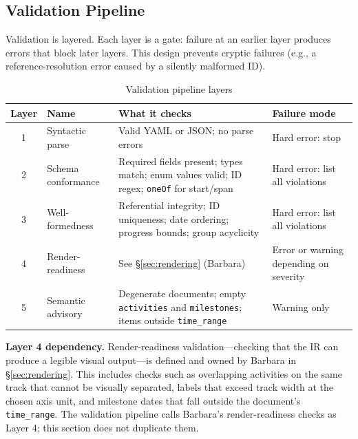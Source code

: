 \subsection{Validation Pipeline}
\label{sec:validation-pipeline}

Validation is layered. Each layer is a gate: failure at an earlier layer produces
errors that block later layers. This design prevents cryptic failures (e.g., a
reference-resolution error caused by a silently malformed ID).

\begin{table}[h]
\centering
\small
\begin{tabular}{clp{4cm}p{4.5cm}}
\toprule
\textbf{Layer} & \textbf{Name} & \textbf{What it checks} & \textbf{Failure mode} \\
\midrule
1 & Syntactic parse       & Valid YAML or JSON; no parse errors & Hard error: stop \\
2 & Schema conformance    & Required fields present; types match; enum values valid; ID regex; \texttt{oneOf} for start/span & Hard error: list all violations \\
3 & Well-formedness       & Referential integrity; ID uniqueness; date ordering; progress bounds; group acyclicity & Hard error: list all violations \\
4 & Render-readiness      & See \S\ref{sec:rendering} (Barbara) & Error or warning depending on severity \\
5 & Semantic advisory     & Degenerate documents; empty \texttt{activities} and \texttt{milestones}; items outside \texttt{time\_range} & Warning only \\
\bottomrule
\end{tabular}
\caption{Validation pipeline layers}
\label{tab:validation-layers}
\end{table}

\textbf{Layer 4 dependency.} Render-readiness validation---checking that the IR can
produce a legible visual output---is defined and owned by Barbara in \S\ref{sec:rendering}.
This includes checks such as overlapping activities on the same track that cannot be
visually separated, labels that exceed track width at the chosen axis unit, and milestone
dates that fall outside the document's \texttt{time\_range}. The validation pipeline
calls Barbara's render-readiness checks as Layer 4; this section does not duplicate them.

